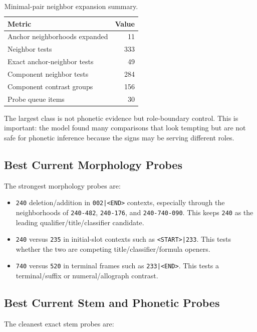 \begin{table}[htbp]
\centering
\begin{tabular}{lr}
\toprule
\textbf{Metric} & \textbf{Value} \\
\midrule
Anchor neighborhoods expanded & 11 \\
Neighbor tests & 333 \\
Exact anchor-neighbor tests & 49 \\
Component neighbor tests & 284 \\
Component contrast groups & 156 \\
Probe queue items & 30 \\
\bottomrule
\end{tabular}
\caption{Minimal-pair neighbor expansion summary.}
\label{tab:minimal-pair-neighbor-summary}
\end{table}

The largest class is not phonetic evidence but role-boundary control. This is important: the model found many comparisons that look tempting but are not safe for phonetic inference because the signs may be serving different roles.

\subsection{Best Current Morphology Probes}

The strongest morphology probes are:

\begin{itemize}
  \item \texttt{240} deletion/addition in \texttt{002|<END>} contexts, especially through the neighborhoods of \texttt{240-482}, \texttt{240-176}, and \texttt{240-740-090}. This keeps \texttt{240} as the leading qualifier/title/classifier candidate.
  \item \texttt{240} versus \texttt{235} in initial-slot contexts such as \texttt{<START>|233}. This tests whether the two are competing title/classifier/formula openers.
  \item \texttt{740} versus \texttt{520} in terminal frames such as \texttt{233|<END>}. This tests a terminal/suffix or numeral/allograph contrast.
\end{itemize}

\subsection{Best Current Stem and Phonetic Probes}

The cleanest exact stem probes are:

